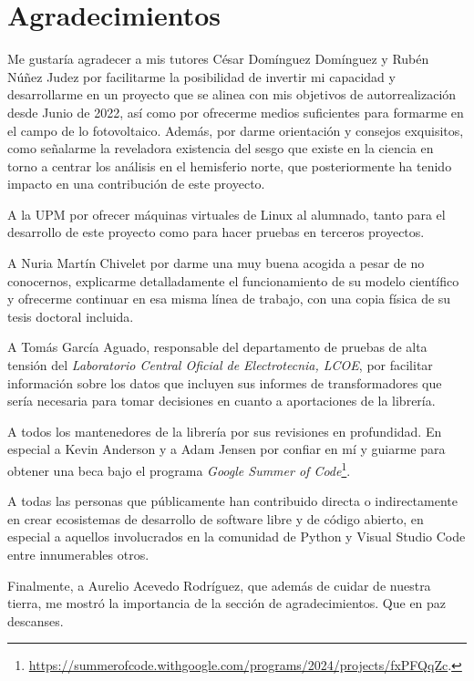 \chapter*{Agradecimientos} \label{chp:agrad}

Me gustaría agradecer a mis tutores César Domínguez Domínguez y Rubén Núñez Judez por facilitarme la posibilidad de invertir mi capacidad y desarrollarme en un proyecto que se alinea con mis objetivos de autorrealización desde Junio de 2022, así como por ofrecerme medios suficientes para formarme en el campo de lo fotovoltaico. Además, por darme orientación y consejos exquisitos, como señalarme la reveladora existencia del sesgo que existe en la ciencia en torno a centrar los análisis en el hemisferio norte, que posteriormente ha tenido impacto en una contribución de este proyecto.

A la UPM por ofrecer máquinas virtuales de Linux al alumnado, tanto para el desarrollo de este proyecto como para hacer pruebas en terceros proyectos.

A Nuria Martín Chivelet por darme una muy buena acogida a pesar de no conocernos, explicarme detalladamente el funcionamiento de su modelo científico y ofrecerme continuar en esa misma línea de trabajo, con una copia física de su tesis doctoral incluida.

A Tomás García Aguado, responsable del departamento de pruebas de alta tensión del \textit{Laboratorio Central Oficial de Electrotecnia, LCOE}, por facilitar información sobre los datos que incluyen sus informes de transformadores que sería necesaria para tomar decisiones en cuanto a aportaciones de la librería.

A todos los mantenedores de la librería \pvlibpy{} por sus revisiones en profundidad. En especial a Kevin Anderson y a Adam Jensen por confiar en mí y guiarme para obtener una beca bajo el programa \textit{Google Summer of Code}\footnote{\url{https://summerofcode.withgoogle.com/programs/2024/projects/fxPFQqZc}.}.

A todas las personas que públicamente han contribuido directa o indirectamente en crear ecosistemas de desarrollo de software libre y de código abierto, en especial a aquellos involucrados en la comunidad de Python y Visual Studio Code entre innumerables otros.

Finalmente, a Aurelio Acevedo Rodríguez, que además de cuidar de nuestra tierra, me mostró la importancia de la sección de agradecimientos. Que en paz descanses.
